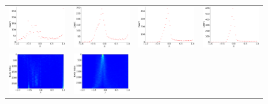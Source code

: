 \documentclass[senior,final,11pt]{iscs-thesis}
\begin{document}
\begin{figure}[htbp]
  \setlength\tabcolsep{0pt}
  \hspace{-3.0cm}
  \begin{tabular}{cccc}
    \includegraphics[width=45mm]{figure/random_geometric_graph_n3000_radius002_dim2txt_dos.png} &
    \includegraphics[width=45mm]{figure/random_geometric_graph_n3000_radius003_dim2txt_dos.png} &
    \includegraphics[width=45mm]{figure/random_geometric_graph_n3000_radius004_dim2txt_dos.png} &
    \includegraphics[width=45mm]{figure/random_geometric_graph_n3000_radius005_dim2txt_dos.png} \\
    \includegraphics[width=45mm]{figure/random_geometric_graph_n3000_radius002_dim2txt_pdos.png} &
    \includegraphics[width=45mm]{figure/random_geometric_graph_n3000_radius003_dim2txt_pdos.png} &

\end{tabular}
\end{figure}
\end{document}
